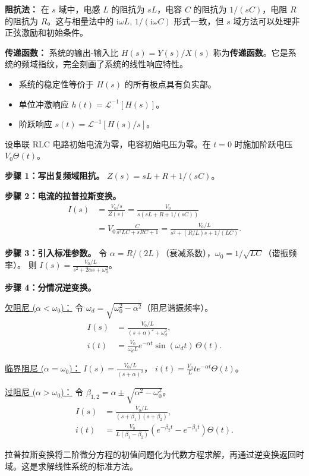 \textbf{阻抗法：} 在 $s$ 域中，电感 $L$ 的阻抗为 $sL$，电容 $C$ 的阻抗为 $1/(sC)$，电阻 $R$ 的阻抗为 $R$。这与相量法中的 $\mathrm{i}\omega L$, $1/(\mathrm{i}\omega C)$ 形式一致，但 $s$ 域方法可以处理非正弦激励和初始条件。

\textbf{传递函数：} 系统的输出-输入比 $H(s) = Y(s)/X(s)$ 称为\textbf{传递函数}。它是系统的频域指纹，完全刻画了系统的线性响应特性。
\begin{itemize}
\item 系统的稳定性等价于 $H(s)$ 的所有极点具有负实部。
\item 单位冲激响应 $h(t) = \mathcal{L}^{-1}[H(s)]$。
\item 阶跃响应 $s(t) = \mathcal{L}^{-1}[H(s)/s]$。
\end{itemize}

\begin{example}
设串联 RLC 电路初始电流为零，电容初始电压为零。在 $t=0$ 时施加阶跃电压 $V_0\Theta(t)$。

\textbf{步骤 1：写出复频域阻抗。}
$Z(s) = sL + R + 1/(sC)$。

\textbf{步骤 2：电流的拉普拉斯变换。}
\begin{align*}
I(s) &= \frac{V_0/s}{Z(s)} = \frac{V_0}{s(sL + R + 1/(sC))} \\
&= V_0\frac{C}{s^2 LC + sRC + 1}
= \frac{V_0/L}{s^2 + (R/L)s + 1/(LC)}.
\end{align*}

\textbf{步骤 3：引入标准参数。}
令 $\alpha = R/(2L)$（衰减系数），$\omega_0 = 1/\sqrt{LC}$（谐振频率）。
则 $I(s) = \frac{V_0/L}{s^2 + 2\alpha s + \omega_0^2}$。

\textbf{步骤 4：分情况逆变换。}

\underline{欠阻尼 ($\alpha<\omega_0$)：}
令 $\omega_d = \sqrt{\omega_0^2 - \alpha^2}$（阻尼谐振频率）。
\begin{align*}
I(s) &= \frac{V_0/L}{(s+\alpha)^2 + \omega_d^2}, \\
i(t) &= \frac{V_0}{\omega_d L}e^{-\alpha t}\sin(\omega_d t)\,\Theta(t).
\end{align*}

\underline{临界阻尼 ($\alpha=\omega_0$)：}
$I(s) = \frac{V_0/L}{(s+\alpha)^2}$，
$i(t) = \frac{V_0}{L}t e^{-\alpha t}\Theta(t)$。

\underline{过阻尼 ($\alpha>\omega_0$)：}
令 $\beta_{1,2} = \alpha \pm \sqrt{\alpha^2 - \omega_0^2}$。
\begin{align*}
I(s) &= \frac{V_0/L}{(s+\beta_1)(s+\beta_2)}, \\
i(t) &= \frac{V_0}{L(\beta_1-\beta_2)}\left(e^{-\beta_2 t} - e^{-\beta_1 t}\right)\Theta(t).
\end{align*}

拉普拉斯变换将二阶微分方程的初值问题化为代数方程求解，再通过逆变换返回时域。这是求解线性系统的标准方法。
\end{example}

